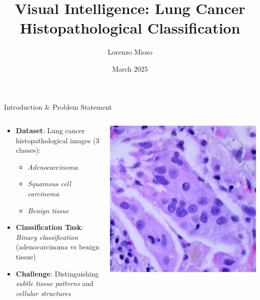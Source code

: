 \documentclass[aspectratio=169,8pt]{beamer}  %
\title{Visual Intelligence: Lung Cancer Histopathological Classification}
\author{Lorenzo Mioso}
\date{March 2025}
\begin{document}
\begin{frame}
\titlepage
\end{frame}

\begin{frame}{Introduction \& Problem Statement}
\begin{columns}[T]
\begin{column}{0.5\textwidth}
\begin{itemize}
\item \textbf{Dataset}: Lung cancer histopathological images (3 classes):
  \begin{itemize}
  \item \emph{Adenocarcinoma}
  \item \emph{Squamous cell carcinoma}
  \item \emph{Benign tissue}
  \end{itemize}
\item \textbf{Classification Task}: \emph{Binary classification} (adenocarcinoma vs benign tissue)
\item \textbf{Challenge}: Distinguishing \emph{subtle tissue patterns} and \emph{cellular structures}
\end{itemize}
\end{column}
\begin{column}{0.5\textwidth}
\hfill\includegraphics[width=0.95\linewidth, height=0.45\textheight]{imgs/adenocarcinoma.jpg}

\end{column}
\end{columns}
\end{frame}
\end{document}

